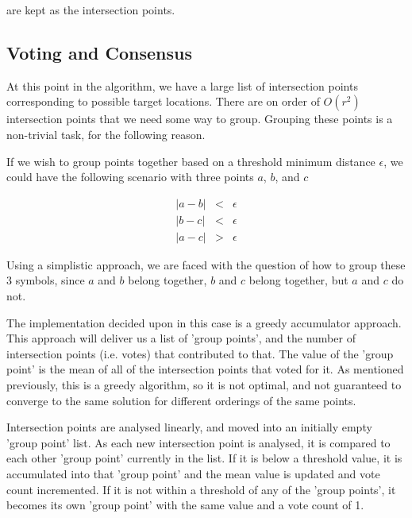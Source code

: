 \documentclass[12pt,openany,a4paper]{book}
\begin{document}
are kept as the intersection points.

\subsection{Voting and Consensus}
\label{sec:Vote}

At this point in the algorithm, we have a large list of intersection points corresponding to possible target locations. There are on order of $O(r^2)$ intersection points that we need some way to group. Grouping these points is a non-trivial task, for the following reason.

\bigskip
If we wish to group points together based on a threshold minimum distance $\epsilon$, we could have the following scenario with three points $a$, $b$, and $c$

\begin{eqnarray}
|a-b| &<& \epsilon \\
|b-c| &<& \epsilon \\
|a-c| &>& \epsilon
\end{eqnarray}

\bigskip

Using a simplistic approach, we are faced with the question of how to group these 3 symbols, since $a$ and $b$ belong together, $b$ and $c$ belong together, but $a$ and $c$ do not.

\bigskip

The implementation decided upon in this case is a greedy accumulator approach. This approach will deliver us a list of 'group points', and the number of intersection points (i.e. votes) that contributed to that. The value of the 'group point' is the mean of all of the intersection points that voted for it. As mentioned previously, this is a greedy algorithm, so it is not optimal, and not guaranteed to converge to the same solution for different orderings of the same points.

\bigskip

Intersection points are analysed linearly, and moved into an initially empty 'group point' list. As each new intersection point is analysed, it is compared to each other 'group point' currently in the list. If it is below a threshold value, it is accumulated into that 'group point' and the mean value is updated and vote count incremented. If it is not within a threshold of any of the 'group points', it becomes its own 'group point' with the same value and a vote count of 1.

\bigskip
\end{document}
